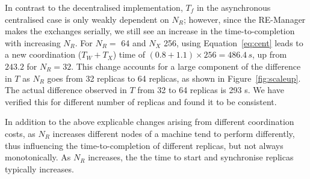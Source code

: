 \documentclass{rspublic}
\newcommand{\jhanote}[1]{ {\textcolor{red} { ***shantenu: #1 }}}
\newcommand{\alnote}[1]{ {\textcolor{blue} { ***andre: #1 }}}
\newcommand{\athotanote}[1]{ {\textcolor{green} { ***athota: #1 }}}
\newcommand{\alnote}[1]{}
\newcommand{\athotanote}[1]{}
\newcommand{\jhanote}[1]{}
\begin{document}


In contrast to the decentralised implementation, $T_f$ in the
asynchronous centralised case is only weakly dependent on $N_R$; however,
since the RE-Manager makes the exchanges serially, we still see an
increase in the time-to-completion with increasing $N_R$. %
For $N_R =$ 64 and $N_X$ 256, using Equation~\ref{eq:cent} leads to a
new coordination ($T_W + T_X$) time of $(0.8+1.1) \times 256 =
486.4\,s$, up from $243.2$ for $N_R = 32$. This change accounts for a
large component of the difference in $T$ as $N_R$ goes from 32
replicas to 64 replicas, as shown in Figure~\ref{fig:scaleup}. The
actual difference observed in $T$ from 32 to 64 replicas is 293
s. %
We have verified this for different number of replicas and found it to
be consistent.

In addition to the above explicable changes arising from different
coordination costs, as $N_R$ increases different nodes of a machine
tend to perform differently, thus influencing the time-to-completion
of different replicas, but not always monotonically.  %
As $N_R$ increases, the the time to start and synchronise replicas
typically increases.

\end{document}
